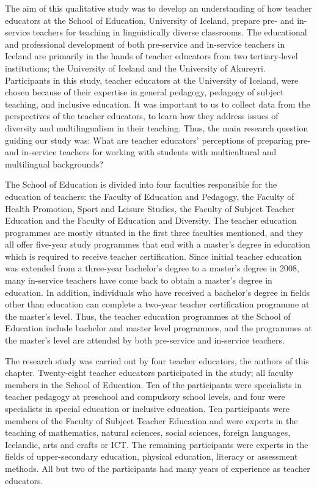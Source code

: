 \documentclass[output=paper]{langscibook}
\begin{document}
The aim of this qualitative study was to develop an understanding of how teacher educators at the School of Education, University of Iceland, prepare pre- and in-service teachers for teaching in linguistically diverse classrooms. The educational and professional development of both pre-service and in-service teachers in Iceland are primarily in the hands of teacher educators from two tertiary-level institutions; the University of Iceland and the University of Akureyri. Participants in this study, teacher educators at the University of Iceland, were chosen because of their expertise in general pedagogy, pedagogy of subject teaching, and inclusive education. It was important to us to collect data from the perspectives of the teacher educators, to learn how they address issues of diversity and multilingualism in their teaching. Thus, the main research question guiding our study was: What are teacher educators’ perceptions of preparing pre- and in-service teachers for working with students with multicultural and multilingual backgrounds?

The School of Education is divided into four faculties responsible for the education of teachers: the Faculty of Education and Pedagogy, the Faculty of Health Promotion, Sport and Leisure Studies, the Faculty of Subject Teacher Education and the Faculty of Education and Diversity. The teacher education programmes are mostly situated in the first three faculties mentioned, and they all offer five-year study programmes that end with a master’s degree in education which is required to receive teacher certification. Since initial teacher education was extended from a three-year bachelor’s degree to a master’s degree in 2008, many in-service teachers have come back to obtain a master’s degree in education. In addition, individuals who have received a bachelor’s degree in fields other than education can complete a two-year teacher certification programme at the master’s level. Thus, the teacher education programmes at the School of Education include bachelor and master level programmes, and the programmes at the master’s level are attended by both pre-service and in-service teachers. 

The research study was carried out by four teacher educators, the authors of this chapter. Twenty-eight teacher educators participated in the study; all faculty members in the School of Education. Ten of the participants were specialists in teacher pedagogy at preschool and compulsory school levels, and four were specialists in special education or inclusive education. Ten participants were members of the Faculty of Subject Teacher Education and were experts in the teaching of mathematics, natural sciences, social sciences, foreign languages, Icelandic, arts and crafts or ICT. The remaining participants were experts in the fields of upper-secondary education, physical education, literacy or assessment methods. All but two of the participants had many years of experience as teacher educators.
\end{document}
